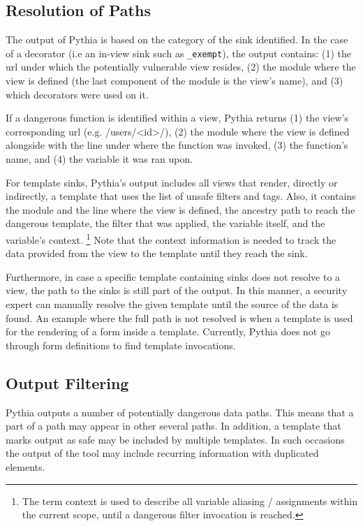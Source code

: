 \subsection{Resolution of Paths}
\label{sec:output}

The output of Pythia is based on the
category of the sink identified.
In the case of a decorator
(i.e an in-view sink such as
{\tt \@csrf\_exempt}),
the output contains:
(1) the {\sc url} under
which the potentially vulnerable
view resides,
(2) the module where the view is defined
(the last component of the module is the view's name), 
and (3) which decorators were used on it.

If a dangerous function is identified within a view,
Pythia returns (1) the view's corresponding
{\sc url} (e.g. /users/<id>/),
(2) the module where the view is defined
alongside with the line under where
the function was invoked,
(3) the function's name,
and (4) the variable it was ran upon.

For template sinks,
Pythia's output includes all views that render,
directly or indirectly,
a template that uses the list of
unsafe filters and tags.
Also,
it contains the module and the line where
the view is defined,
the ancestry path to reach the dangerous template,
the filter that was applied,
the variable itself,
and the variable's context.
\footnote{The term context is used to describe all variable aliasing / assignments
within the current scope, until a dangerous filter invocation is reached.}
Note that the context information is needed
to track the data provided from the view to
the template until they reach the sink.

Furthermore,
in case a specific template containing sinks
does not resolve to a view,
the path to the sinks is still part of the output.
In this manner,
a security expert can manually resolve
the given template until the source
of the data is found.
An example where the full path is not
resolved is when a template is used
for the rendering of a form inside a template.
Currently,
Pythia does not go through form definitions
to find template invocations.

\vspace{-1.5mm}

\subsection{Output Filtering}
\label{sec:filtering}

Pythia outputs a number of potentially
dangerous data paths.
This means that a part of a path
may appear in other several paths.
In addition,
a template that marks output
as safe may be included by multiple
templates.
In such occasions the output of
the tool may include recurring information
with duplicated elements.

